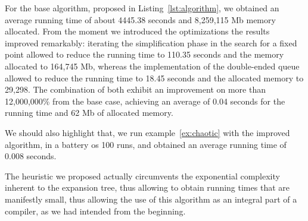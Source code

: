 For the base algorithm, proposed in Listing~\ref{lst:algorithm}, we
obtained an average running time of about 4445.38 seconds and
8,259,115 Mb memory allocated. From the moment we introduced the
optimizations the results improved remarkably: iterating the
simplification phase in the search for a fixed point allowed to reduce
the running time to 110.35 seconds and the memory allocated to 164,745
Mb, whereas the implementation of the double-ended queue allowed to
reduce the running time to 18.45 seconds and the allocated memory to
29,298. The combination of both exhibit an improvement on more than
12,000,000\% from the base case, achieving an average of 0.04
seconds for the running time and 62 Mb of allocated memory.

We should also highlight that, we run example~\eqref{ex:chaotic}
with the improved algorithm, in a battery os 100 runs, and obtained an
average running time of 0.008 seconds.

The heuristic we proposed actually circumvents the exponential complexity 
inherent to the expansion tree, thus allowing to obtain running times that 
are manifestly small, thus allowing the use of this algorithm as an integral 
part of a compiler, as we had intended from the beginning.

